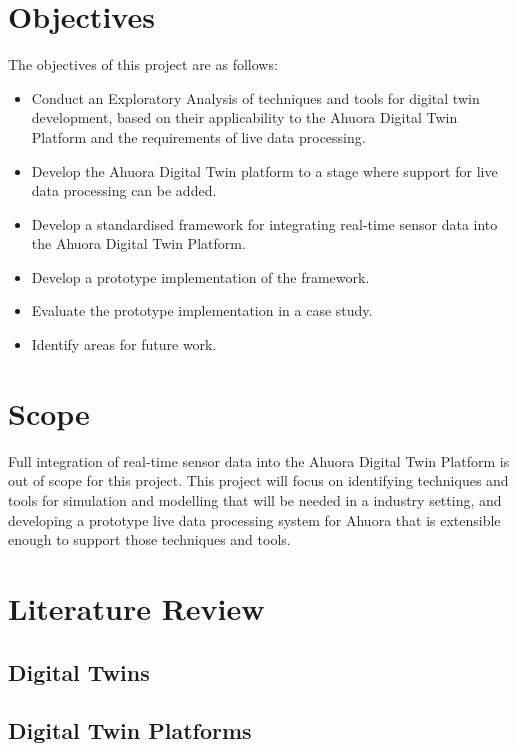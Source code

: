 \documentclass[12pt]{report}
\begin{document}
\section{Objectives}

The objectives of this project are as follows:
\begin{itemize}
    \item Conduct an Exploratory Analysis of techniques and tools for digital twin development, based on their applicability to the Ahuora Digital Twin Platform and the requirements of live data processing.
    \item Develop the Ahuora Digital Twin platform to a stage where support for live data processing can be added.
    \item Develop a standardised framework for integrating real-time sensor data into the Ahuora Digital Twin Platform.
    \item Develop a prototype implementation of the framework.
    \item Evaluate the prototype implementation in a case study.
    \item Identify areas for future work.
\end{itemize}
\section{Scope}

Full integration of real-time sensor data into the Ahuora Digital Twin Platform is out of scope for this project.
This project will focus on identifying techniques and tools for simulation and modelling that will be needed in a industry setting,
and developing a prototype live data processing system for Ahuora that is extensible enough to support those techniques and tools.


\section{Literature Review}


\subsection{Digital Twins}

\subsection{Digital Twin Platforms}
\end{document}
